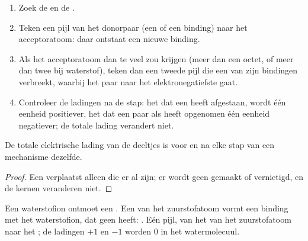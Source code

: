 \begin{method}\label{met:g12:curly-arrows:drawing}
\begin{enumerate}
  \item Zoek de  en de .
  \item Teken een pijl van het donorpaar (een  of een
        binding) naar het acceptoratoom: daar ontstaat een nieuwe binding.
  \item Als het acceptoratoom dan te veel  zou krijgen (meer
        dan een octet, of meer dan twee bij waterstof), teken dan een
        tweede pijl die een van zijn bindingen verbreekt, waarbij het
        paar naar het elektronegatiefste  gaat.
  \item Controleer de ladingen na de stap: het  dat een  heeft afgestaan, wordt één eenheid positiever, het
         dat een paar als  heeft opgenomen één
        eenheid negatiever; de totale lading verandert niet.
\end{enumerate}
\end{method}

\begin{proposition}\label{prop:g12:curly-arrows:charge}
De totale elektrische lading van de deeltjes is voor en na elke stap van
een mechanisme dezelfde.
\end{proposition}

\begin{proof}
Een  verplaatst alleen  die er al zijn; er wordt
geen  gemaakt of vernietigd, en de kernen veranderen niet.
\end{proof}

\begin{example}\label{ex:g12:curly-arrows:first}
Een waterstofion  ontmoet een  . Een  van het zuurstofatoom vormt een binding met het
waterstofion, dat geen  heeft:
. Eén pijl, van het  van het
zuurstofatoom naar het ; de ladingen $+1$ en $-1$ worden 0 in het
watermolecuul.
\end{example}

